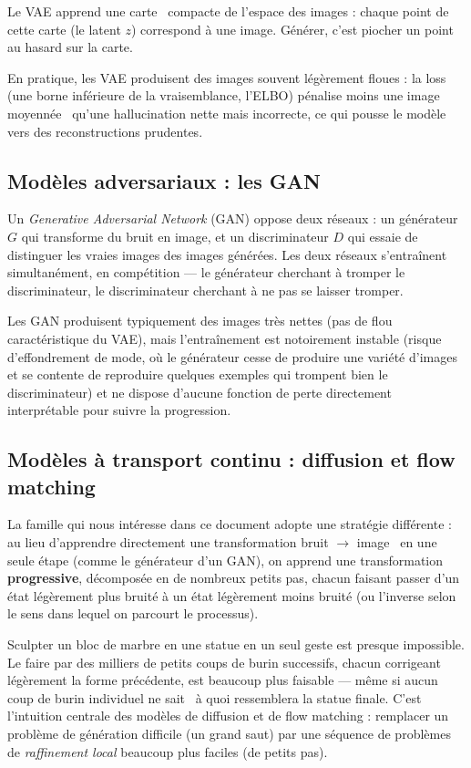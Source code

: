 \begin{intuition}
Le VAE apprend une \og carte \fg\ compacte de l'espace des images : chaque point de cette carte (le
latent $z$) correspond à une image. Générer, c'est piocher un point au hasard sur la carte.
\end{intuition}

En pratique, les VAE produisent des images souvent légèrement floues : la loss (une borne inférieure
de la vraisemblance, l'ELBO) pénalise moins une image \og moyennée \fg\ qu'une hallucination nette
mais incorrecte, ce qui pousse le modèle vers des reconstructions prudentes.

\subsection{Modèles adversariaux : les GAN}

Un \emph{Generative Adversarial Network} (GAN) oppose deux réseaux : un générateur $G$ qui transforme
du bruit en image, et un discriminateur $D$ qui essaie de distinguer les vraies images des images
générées. Les deux réseaux s'entraînent simultanément, en compétition — le générateur cherchant à
tromper le discriminateur, le discriminateur cherchant à ne pas se laisser tromper.

Les GAN produisent typiquement des images très nettes (pas de flou caractéristique du VAE), mais
l'entraînement est notoirement instable (risque d'effondrement de mode, où le générateur cesse de
produire une variété d'images et se contente de reproduire quelques exemples qui trompent bien le
discriminateur) et ne dispose d'aucune fonction de perte directement interprétable pour suivre la
progression.

\subsection{Modèles à transport continu : diffusion et flow matching}

La famille qui nous intéresse dans ce document adopte une stratégie différente : au lieu d'apprendre
directement une transformation \og bruit $\to$ image \fg\ en une seule étape (comme le générateur d'un
GAN), on apprend une transformation \textbf{progressive}, décomposée en de nombreux petits pas, chacun
faisant passer d'un état légèrement plus bruité à un état légèrement moins bruité (ou l'inverse selon
le sens dans lequel on parcourt le processus).

\begin{intuition}
Sculpter un bloc de marbre en une statue en un seul geste est presque impossible. Le faire par des
milliers de petits coups de burin successifs, chacun corrigeant légèrement la forme précédente, est
beaucoup plus faisable — même si aucun coup de burin individuel ne \og sait \fg\ à quoi ressemblera la
statue finale. C'est l'intuition centrale des modèles de diffusion et de flow matching : remplacer un
problème de génération difficile (un grand saut) par une séquence de problèmes de \emph{raffinement
local} beaucoup plus faciles (de petits pas).
\end{intuition}

